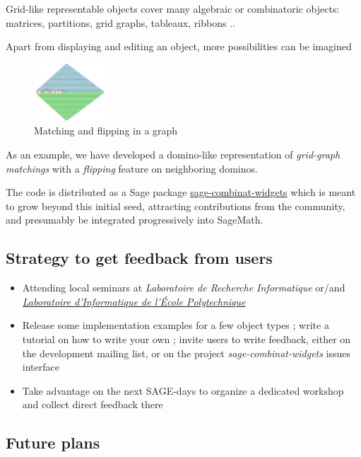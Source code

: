 \documentclass{deliverablereport}
\begin{document}
Grid-like representable objects cover many algebraic or combinatoric
objects: matrices, partitions, grid graphs, tableaux, ribbons ..

Apart from displaying and editing an object, more possibilities can be
imagined

\begin{figure}
    \begin{center}
      \includegraphics[width=100px]{images/dominos-azteque}
      \caption{Matching and flipping in a graph}
\end{center}
\end{figure}

As an example, we have developed a domino-like representation of
\emph{grid-graph matchings} with a \emph{flipping} feature on neighboring dominos.

The code is distributed as a Sage package
\href{https://github.com/sagemath/sage-combinat-widgets/}{sage-combinat-widgets}
which is meant to grow beyond this initial seed, attracting
contributions from the community, and presumably be integrated
progressively into SageMath.

\subsection{Strategy to get feedback from users}

\begin{itemize}
  \item Attending local seminars at \emph{Laboratoire de Recherche Informatique} or/and \emph{\href{https://www.lix.polytechnique.fr/}{Laboratoire d'Informatique de l'École Polytechnique}}
  \item Release some implementation examples for a few object types ; write a tutorial on how to write your own ; invite users to write feedback, either on the development mailing list, or on the  project \emph{sage-combinat-widgets} issues interface
  \item Take advantage on the next SAGE-days to organize a dedicated workshop and collect direct feedback there
\end{itemize}

\subsection{Future plans}
\end{document}
